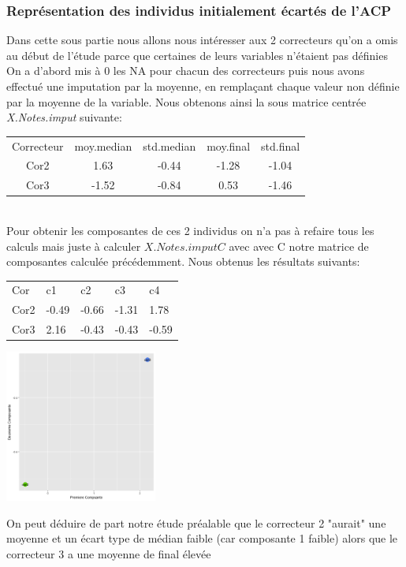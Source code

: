 \documentclass[10pt]{article}
\begin{document}
\subsubsection{Représentation des individus initialement écartés de l’ACP}
Dans cette sous partie nous allons nous intéresser aux 2 correcteurs qu'on a omis au début de l'étude parce que certaines de leurs variables n'étaient pas définies On a d'abord mis à 0 les NA pour chacun des correcteurs puis nous avons effectué une imputation par la moyenne, en remplaçant chaque valeur non définie par la moyenne de la variable. Nous obtenons ainsi la sous matrice centrée \textit{X.Notes.imput} suivante:\\

\begin{tabular}{c c c c c}
	Correcteur & moy.median &	std.median	& moy.final	&std.final\\
	Cor2 & 1.63 &	-0.44 &	-1.28 &	-1.04\\
	Cor3 & -1.52 &	-0.84 &	0.53 &	-1.46
\end{tabular}
\vspace{0.9mm}
\\Pour obtenir les composantes de ces 2 individus on n'a pas à refaire tous les calculs mais juste à calculer $X.Notes.imput C$ avec avec C notre matrice de composantes calculée précédemment. Nous obtenus les résultats suivants:\\

\begin{minipage}[t]{0.5\textwidth}
\begin{tabular}{l l l l l}
	Cor &  c1         &             c2 &          c3               &  c4\\
	Cor2 & -0.49 &	-0.66&	-1.31 &	1.78\\
	Cor3 & 2.16	& -0.43  &	-0.43& 	-0.59
\end{tabular}
\end{minipage}
\begin{minipage}[t]{0.5\textwidth}
		\includegraphics[width=50mm]{Figures/Notes_PCA/individus_comp_na.png}
	\label{fig:individus_comp_na}	
\end{minipage}
On peut déduire de part notre étude préalable que le correcteur 2 "aurait" une moyenne et un écart type de médian faible (car composante 1 faible) alors que le correcteur 3 a une moyenne de final élevée
\end{document}
